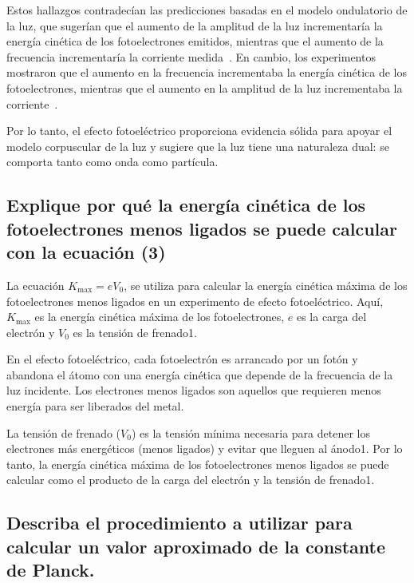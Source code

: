 \documentclass[twocolumn, 12pt]{article}
\begin{document}
Estos hallazgos contradecían las predicciones basadas en el
modelo ondulatorio de la luz, que sugerían que el aumento
de la amplitud de la luz incrementaría la energía cinética
de los fotoelectrones emitidos, mientras que el aumento de
la frecuencia incrementaría la corriente
medida~\cite{cite_3}. En cambio, los experimentos mostraron
que el aumento en la frecuencia incrementaba la energía
cinética de los fotoelectrones, mientras que el aumento en
la amplitud de la luz incrementaba la
corriente~\cite{cite_3}.

Por lo tanto, el efecto fotoeléctrico proporciona evidencia
sólida para apoyar el modelo corpuscular de la luz y
sugiere que la luz tiene una naturaleza dual: se comporta
tanto como onda como partícula.

\subsection*{Explique por qué la energía cinética de los fotoelectrones menos ligados se puede
      calcular con la ecuación (3)}

La ecuación $K_{\max}= e V_0$, se utiliza para calcular la
energía cinética máxima de los fotoelectrones menos ligados
en un experimento de efecto fotoeléctrico. Aquí, $K_{\max}$
es la energía cinética máxima de los fotoelectrones, $e$ es
la carga del electrón y $V_0$ es la tensión de frenado1.

En el efecto fotoeléctrico, cada fotoelectrón es arrancado
por un fotón y abandona el átomo con una energía cinética
que depende de la frecuencia de la luz incidente. Los
electrones menos ligados son aquellos que requieren menos
energía para ser liberados del metal.

La tensión de frenado ($V_0$) es la tensión mínima
necesaria para detener los electrones más energéticos
(menos ligados) y evitar que lleguen al ánodo1. Por lo
tanto, la energía cinética máxima de los fotoelectrones
menos ligados se puede calcular como el producto de la
carga del electrón y la tensión de frenado1.

\subsection*{Describa el procedimiento a utilizar para calcular un valor aproximado de la constante
      de Planck.}
\end{document}
